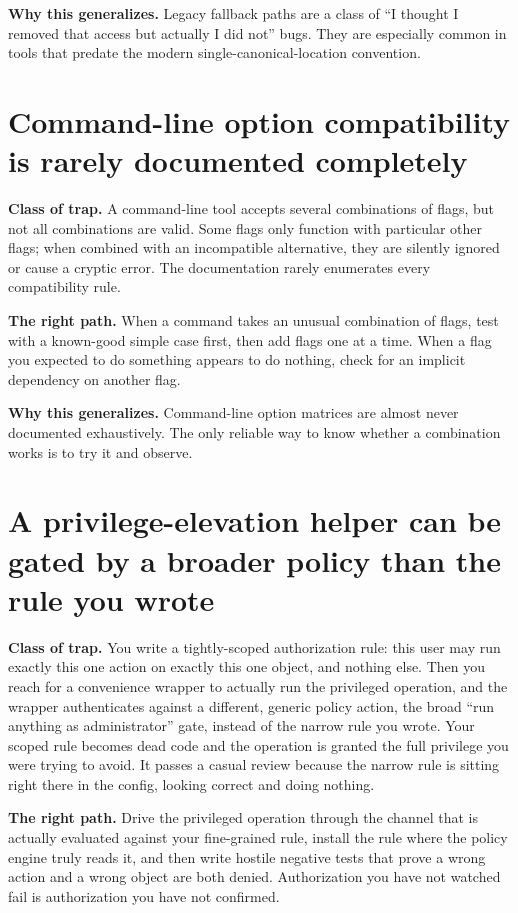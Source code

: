 \documentclass[12pt]{article}
\begin{document}
\textbf{Why this generalizes.} Legacy fallback paths are a class of ``I thought I removed that access but actually I did not'' bugs. They are especially common in tools that predate the modern single-canonical-location convention.

\section{Command-line option compatibility is rarely documented completely}

\textbf{Class of trap.} A command-line tool accepts several combinations of flags, but not all combinations are valid. Some flags only function with particular other flags; when combined with an incompatible alternative, they are silently ignored or cause a cryptic error. The documentation rarely enumerates every compatibility rule.

\textbf{The right path.} When a command takes an unusual combination of flags, test with a known-good simple case first, then add flags one at a time. When a flag you expected to do something appears to do nothing, check for an implicit dependency on another flag.

\textbf{Why this generalizes.} Command-line option matrices are almost never documented exhaustively. The only reliable way to know whether a combination works is to try it and observe.

\section{A privilege-elevation helper can be gated by a broader policy than the rule you wrote}

\textbf{Class of trap.} You write a tightly-scoped authorization rule: this user may run exactly this one action on exactly this one object, and nothing else. Then you reach for a convenience wrapper to actually run the privileged operation, and the wrapper authenticates against a different, generic policy action, the broad ``run anything as administrator'' gate, instead of the narrow rule you wrote. Your scoped rule becomes dead code and the operation is granted the full privilege you were trying to avoid. It passes a casual review because the narrow rule is sitting right there in the config, looking correct and doing nothing.

\textbf{The right path.} Drive the privileged operation through the channel that is actually evaluated against your fine-grained rule, install the rule where the policy engine truly reads it, and then write hostile negative tests that prove a wrong action and a wrong object are both denied. Authorization you have not watched fail is authorization you have not confirmed.
\end{document}
